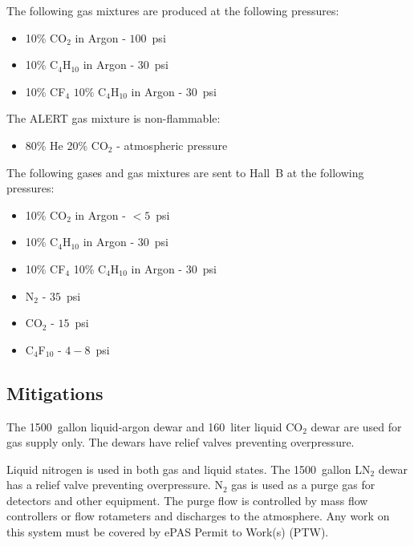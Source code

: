 The following gas mixtures are produced at the following pressures:

\begin{itemize}
\item 10\% CO$_2$ in Argon - $100$~psi
\item 10\% C$_4$H$_{10}$ in Argon - $30$~psi
\item 10\% CF$_4$ $10\%$ C$_4$H$_{10}$ in Argon - $30$~psi
\end{itemize}

The ALERT gas mixture is non-flammable:

\begin{itemize}
\item 80\% He 20\% CO$_2$ - atmospheric pressure
\end{itemize}

The following gases and gas mixtures are sent to Hall~B at the following pressures:

\begin{itemize}
\item 10\% CO$_2$ in Argon - $<5$~psi
\item 10\% C$_4$H$_{10}$ in Argon - $30$~psi
\item 10\% CF$_4$ 10\% C$_4$H$_{10}$ in Argon - $30$~psi
\item N$_2$ - $35$~psi
\item CO$_2$ - $15$~psi
\item C$_4$F$_{10}$ - $4 - 8$~psi
\end{itemize}

\subsection{Mitigations}

The 1500~gallon liquid-argon dewar and 160~liter liquid CO$_2$ dewar are used for gas supply 
only. The dewars have relief valves preventing overpressure.

Liquid nitrogen is used in both gas and liquid states. The 1500~gallon LN$_2$ dewar has a 
relief valve preventing overpressure.  
N$_2$ gas is used as a purge gas for detectors and other equipment. The purge flow is 
controlled by mass flow controllers or flow rotameters and discharges to the atmosphere.
Any work on this system must be covered by ePAS Permit to Work(s) (PTW).

